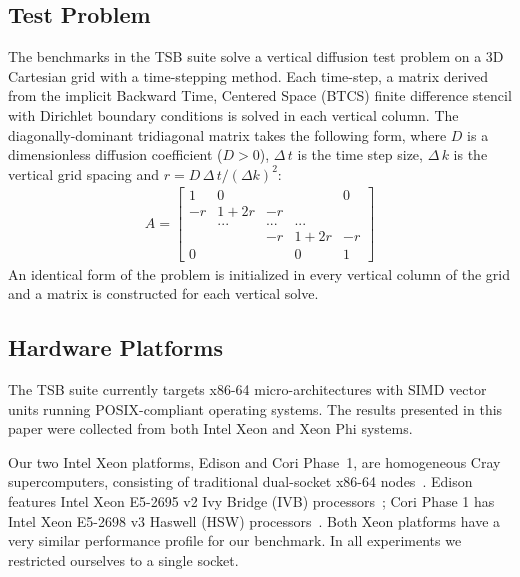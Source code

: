 \documentclass[10pt, conference, compsocconf]{IEEEtran}
\begin{document}
\subsection{Test Problem}
\label{sec:setup:test_problem}

The benchmarks in the TSB suite solve a vertical diffusion test problem on a 3D
  Cartesian grid with a time-stepping method.
Each time-step, a matrix  derived from the implicit Backward Time, Centered
  Space (BTCS) finite difference stencil with Dirichlet boundary conditions is
  solved in each vertical column. 
The diagonally-dominant tridiagonal matrix takes the following form,
  where \(D\) is a dimensionless diffusion coefficient (\(D > 0\)),
  \(\Delta \, t\) is the time step size, \(\Delta \, k\) is the vertical grid
  spacing and \(r=D \, \Delta \, t / (\Delta k)^2 \):
\begin{align*}
A = 
\begin{bmatrix}
1   & 0      &     &        & 0  \\
-r  & 1 + 2r & -r  &        &    \\
    & ...    & ... & ...    &    \\
    &        & -r  & 1 + 2r & -r \\
0   &        &     & 0      & 1
\end{bmatrix}  
\end{align*}
An identical form of the problem is initialized in every vertical column of the
  grid and a matrix is constructed for each vertical solve.

\subsection{Hardware Platforms}
\label{sec:setup:hardware_platforms}

The TSB suite currently targets x86-64 micro-architectures with SIMD vector units
  running POSIX-compliant operating systems.
The results presented in this paper were collected from both Intel Xeon and
  Xeon Phi systems.

Our two Intel Xeon platforms, Edison and Cori Phase~1, are homogeneous Cray
  supercomputers, consisting of traditional dual-socket x86-64
  nodes~\cite{nersc_systems}.
Edison features Intel Xeon E5-2695 v2 Ivy Bridge
  (IVB) processors~\cite{intel_ark_xeon_e5_2695_v2}; Cori Phase 1 has Intel
  Xeon E5-2698 v3 Haswell (HSW) processors~\cite{intel_ark_xeon_e5_2698_v3}.
Both Xeon platforms have a very similar performance profile for
  our benchmark.
In all experiments we restricted ourselves to a single socket. 
\end{document}
